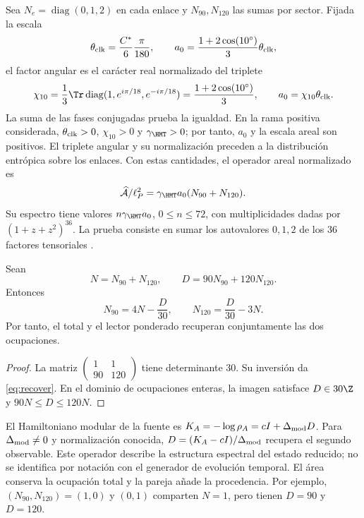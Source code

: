 Sea $N_e=\operatorname{diag}(0,1,2)$ en cada enlace y
$N_{90},N_{120}$ las sumas por sector. Fijada la escala
\[
\theta_{\rm clk}=\frac{C^*}{6}\frac{\pi}{180},\qquad
a_0=\frac{1+2\cos(10^\circ)}3\theta_{\rm clk},
\]
el factor angular es el carácter real normalizado del triplete
\begin{equation}
 \chi_{10}=\frac13\Tr\operatorname{diag}
       (1,e^{i\pi/18},e^{-i\pi/18})
 =\frac{1+2\cos(10^\circ)}3,
 \qquad a_0=\chi_{10}\theta_{\rm clk}.
 \label{eq:ii-area-caracter-triplete}
\end{equation}
La suma de las fases conjugadas prueba la igualdad. En la rama positiva
considerada, \(\theta_{\rm clk}>0\), \(\chi_{10}>0\) y
\(\gamma_{\HMT}>0\); por tanto, \(a_0\) y la escala areal son
positivos. El triplete angular y su normalización preceden a la
distribución entrópica sobre los enlaces. Con estas cantidades,
el operador areal normalizado es
\[
\widehat{\mathcal A}/\ell_P^2
=\gamma_{\HMT}a_0(N_{90}+N_{120}).
\]
Su espectro tiene valores $n\gamma_{\HMT}a_0$, $0\le n\le72$,
con multiplicidades dadas por $(1+z+z^2)^{36}$.
La prueba consiste en sumar los autovalores $0,1,2$ de los
36 factores tensoriales \cite{area}.

\begin{theorem}
Sean
\[
N=N_{90}+N_{120},\qquad D=90N_{90}+120N_{120}.
\]
Entonces
\begin{equation}
N_{90}=4N-\frac D{30},\qquad
N_{120}=\frac D{30}-3N.
\label{eq:recover}
\end{equation}
Por tanto, el total y el lector ponderado recuperan conjuntamente
las dos ocupaciones.
\end{theorem}
\begin{proof}
La matriz $\left(\begin{smallmatrix}1&1\\90&120\end{smallmatrix}\right)$
tiene determinante $30$. Su inversión da \eqref{eq:recover}.
En el dominio de ocupaciones enteras, la imagen satisface
$D\in30\Z$ y $90N\le D\le120N$.
\end{proof}

El Hamiltoniano modular de la fuente es
$K_A=-\log\rho_A=cI+\Delta_{\rm mod}D$.
Para $\Delta_{\rm mod}\ne0$ y normalización conocida,
$D=(K_A-cI)/\Delta_{\rm mod}$ recupera el segundo observable.
Este operador describe la estructura espectral del estado reducido;
no se identifica por notación con el generador de evolución temporal.
El área conserva la ocupación total y la pareja añade la procedencia.
Por ejemplo, $(N_{90},N_{120})=(1,0)$ y $(0,1)$ comparten $N=1$,
pero tienen $D=90$ y $D=120$.

